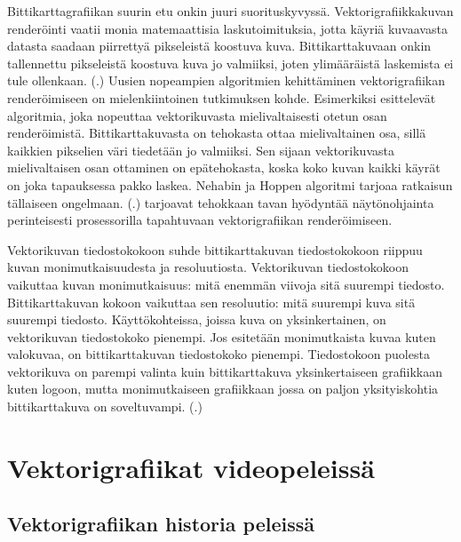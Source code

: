 \documentclass[utf8,bachelor]{gradu3}
\newcommand{\parencitedot}[1]{(\cite{#1}.)}
\begin{document}
Bittikarttagrafiikan suurin etu onkin juuri suorituskyvyssä. Vektorigrafiikkakuvan renderöinti vaatii monia matemaattisia laskutoimituksia, jotta käyriä kuvaavasta datasta saadaan piirrettyä pikseleistä koostuva kuva. Bittikarttakuvaan onkin tallennettu pikseleistä koostuva kuva jo valmiiksi, joten ylimääräistä laskemista ei tule ollenkaan. \parencitedot{RefWorks:doc:5bdc5292e4b05afcfde5b171} Uusien nopeampien algoritmien kehittäminen vektorigrafiikan renderöimiseen on mielenkiintoinen tutkimuksen kohde. Esimerkiksi \textcite{RefWorks:doc:5bdf538de4b04939ba18218f} esittelevät algoritmia, joka nopeuttaa vektorikuvasta mielivaltaisesti otetun osan renderöimistä. Bittikarttakuvasta on tehokasta ottaa mielivaltainen osa, sillä kaikkien pikselien väri tiedetään jo valmiiksi. Sen sijaan vektorikuvasta mielivaltaisen osan ottaminen on epätehokasta, koska koko kuvan kaikki käyrät on joka tapauksessa pakko laskea. Nehabin ja Hoppen algoritmi tarjoaa ratkaisun tällaiseen ongelmaan. \parencitedot{RefWorks:doc:5bdf538de4b04939ba18218f} \textcite{RefWorks:doc:5bc4a5cce4b080e02f7eff1b} tarjoavat tehokkaan tavan hyödyntää näytönohjainta perinteisesti prosessorilla tapahtuvaan vektorigrafiikan renderöimiseen.

Vektorikuvan tiedostokokoon suhde bittikarttakuvan tiedostokokoon riippuu kuvan monimutkaisuudesta ja resoluutiosta. Vektorikuvan tiedostokokoon vaikuttaa kuvan monimutkaisuus: mitä enemmän viivoja sitä suurempi tiedosto. Bittikarttakuvan kokoon vaikuttaa sen resoluutio: mitä suurempi kuva sitä suurempi tiedosto. Käyttökohteissa, joissa kuva on yksinkertainen, on vektorikuvan tiedostokoko pienempi. Jos esitetään monimutkaista kuvaa kuten valokuvaa, on bittikarttakuvan tiedostokoko pienempi. Tiedostokoon puolesta vektorikuva on parempi valinta kuin bittikarttakuva yksinkertaiseen grafiikkaan kuten logoon, mutta monimutkaiseen grafiikkaan jossa on paljon yksityiskohtia bittikarttakuva on soveltuvampi. \parencitedot{RefWorks:doc:5bdf4af9e4b0f02deeb8a48a}

\chapter{Vektorigrafiikat videopeleissä}

\section{Vektorigrafiikan historia peleissä}

\end{document}
